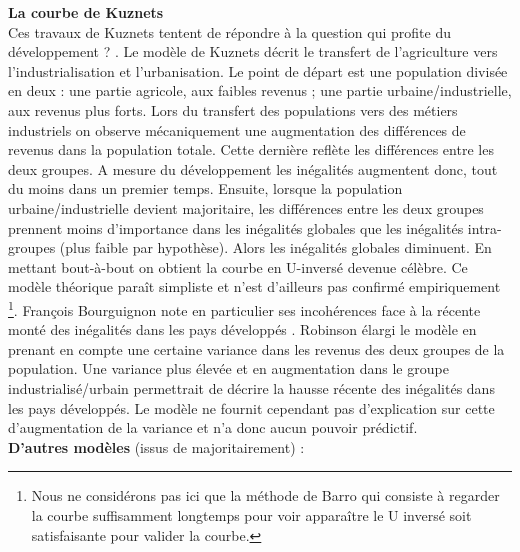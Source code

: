 \documentclass[11pt,a4paper]{article}
\begin{document}
\noindent 
\textbf{La courbe de Kuznets}\\
Ces travaux de Kuznets tentent de répondre à la question \og qui profite du développement ? \fg{}. Le modèle de Kuznets décrit le transfert de l'agriculture vers l'industrialisation et l'urbanisation. Le point de départ est une population divisée en deux : une partie agricole, aux faibles revenus ; une partie urbaine/industrielle, aux revenus plus forts. Lors du transfert des populations vers des métiers industriels on observe mécaniquement une augmentation des différences de revenus dans la population totale. Cette dernière reflète les différences entre les deux groupes. A mesure du développement les inégalités augmentent donc, tout du moins dans un premier temps. Ensuite, lorsque la population urbaine/industrielle devient majoritaire, les différences entre les deux groupes prennent moins d'importance dans les inégalités globales que les inégalités intra-groupes (plus faible par hypothèse). Alors les inégalités globales diminuent. En mettant bout-à-bout on obtient la courbe en \og U-inversé \fg{} devenue célèbre. 
Ce modèle théorique paraît simpliste et n'est d'ailleurs pas confirmé empiriquement \footnote{Nous ne considérons pas ici que la méthode de Barro \cite{barro} qui consiste à regarder la courbe suffisamment longtemps pour voir apparaître le U inversé soit satisfaisante pour valider la courbe.}. François Bourguignon note en particulier ses incohérences face à la récente monté des inégalités dans les pays développés \cite{bourguignon2015}. Robinson \cite{robinson} élargi le modèle en prenant en compte une certaine variance dans les revenus des deux groupes de la population. Une variance plus élevée et en augmentation dans le groupe industrialisé/urbain permettrait de décrire la hausse récente des inégalités dans les pays développés. Le modèle ne fournit cependant pas d'explication sur cette d'augmentation de la variance et n'a donc aucun pouvoir prédictif. \\

\noindent
\textbf{D'autres modèles }(issus de \cite{bourguignon2015} majoritairement) :  \\
\end{document}
